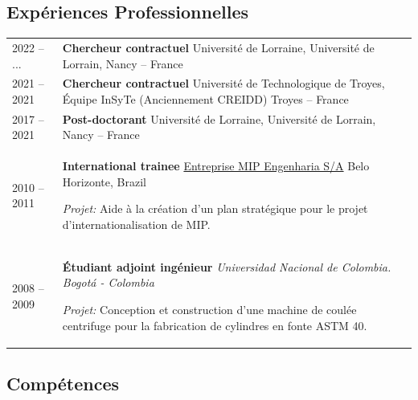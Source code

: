 \documentclass[
  11pt,
]{article}
\begin{document}
\vspace{-0.25cm}

\hypertarget{expuxe9riences-professionnelles}{%
\subsection{Expériences
Professionnelles}\label{expuxe9riences-professionnelles}}

\extrarowsep=3pt
\begin{tabu} to \linewidth {X[0.3,l] X[2,l]}
2022 -- ... &
    \textbf{Chercheur contractuel} Université de Lorraine, Université de Lorrain, Nancy -- France \\[5pt]

2021 -- 2021 &
    \textbf{Chercheur contractuel} Université de Technologique de Troyes, Équipe InSyTe (Anciennement CREIDD) Troyes -- France \\[5pt]

2017 -- 2021 &
    \textbf{Post-doctorant} Université de Lorraine, Université de Lorrain, Nancy -- France \\[5pt]

2010 -- 2011 & \textbf{International trainee} \href{http://www.mipengenharia.com.br/}{Entreprise MIP Engenharia S/A} \thinspace Belo Horizonte, Brazil \par
\textit{Projet:} Aide à la création d'un plan stratégique pour le projet d'internationalisation de MIP.  \\
    
2008 -- 2009 &
    \textbf{Étudiant adjoint ingénieur} \emph{Universidad Nacional de Colombia. Bogotá - Colombia}  \par 
    \emph{Projet:} Conception et construction d'une machine de coulée centrifuge pour la fabrication de cylindres en fonte ASTM 40. \\
\end{tabu}

\vspace{-0.25cm}

\hypertarget{compuxe9tences}{%
\subsection{Compétences}\label{compuxe9tences}}
\end{document}
